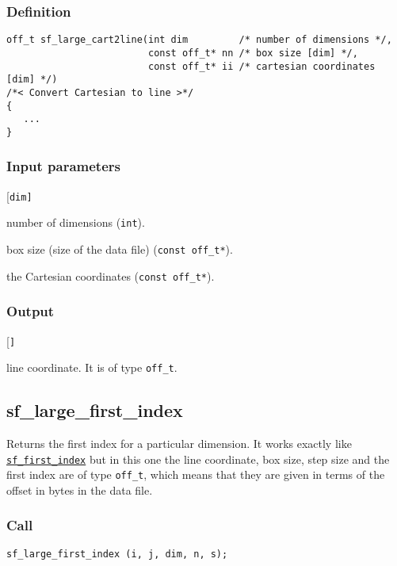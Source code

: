 \subsubsection*{Definition}
\begin{verbatim}
off_t sf_large_cart2line(int dim         /* number of dimensions */, 
                         const off_t* nn /* box size [dim] */, 
                         const off_t* ii /* cartesian coordinates [dim] */) 
/*< Convert Cartesian to line >*/
{
   ...
}
\end{verbatim}


\subsubsection*{Input parameters}
\begin{desclist}{\tt }{\quad}[\tt dim]
   \setlength\itemsep{0pt}
   \item[dim] number of dimensions (\texttt{int}). 
   \item[nn]  box size (size of the data file) (\texttt{const off\_t*}).  
   \item[ii]  the Cartesian coordinates (\texttt{const off\_t*}).  
\end{desclist}

\subsubsection*{Output}
\begin{desclist}{\tt }{\quad}[\tt ]
   \setlength\itemsep{0pt}
   \item[i] line coordinate. It is of type \texttt{off\_t}.
\end{desclist}




\subsection{{sf\_large\_first\_index}}
Returns the first index for a particular dimension. It works exactly like \hyperref[sec:sf_first_index]{\texttt{sf\_first\_index}} but in this one the line coordinate, box size, step size and the first index are of type \texttt{off\_t}, which means that they are given in terms of the offset in bytes in the data file.

\subsubsection*{Call}
\begin{verbatim}sf_large_first_index (i, j, dim, n, s);\end{verbatim}


